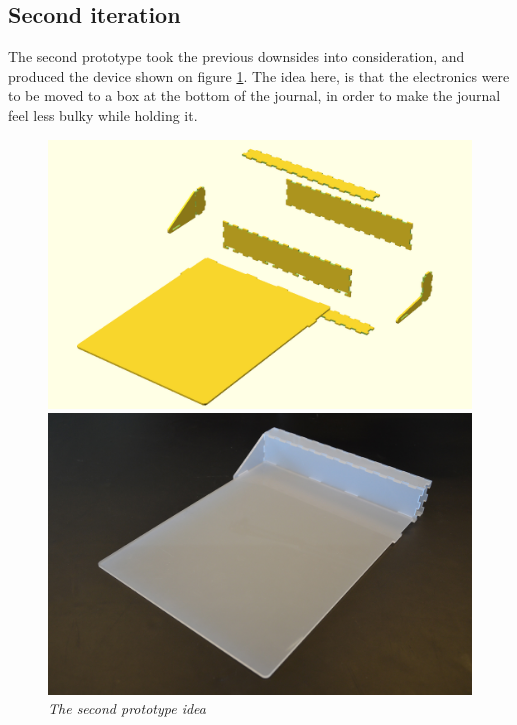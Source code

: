 
\subsection{Second iteration}
The second prototype took the previous downsides into consideration, and produced the device shown on figure \ref{fig:v2}. The idea here, is that the electronics were to be moved to a box at the bottom of the journal, in order to make the journal feel less bulky while holding it.

\begin{figure}[h]
\begin{minipage}[b]{.5\textwidth}
\includegraphics[width=1.05\textwidth]{figures/iterations/v3.png}
\end{minipage}
\begin{minipage}[b]{.5\textwidth}
\includegraphics[width=1\textwidth]{figures/iterations/v3-photo.jpg}
\end{minipage}
\caption{\small {\it {The second prototype idea}}} 
\label{fig:v2}
\end{figure}

